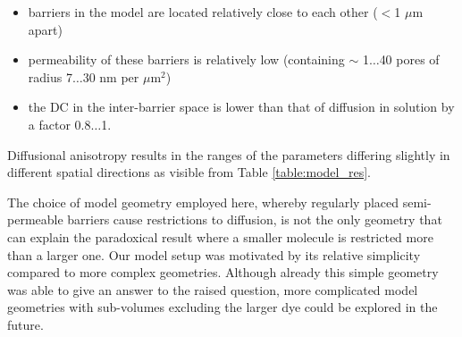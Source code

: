 \begin{itemize}
  \item barriers in the model are located relatively close to each other ($<$1 $\mu$m apart)
  \item permeability of these barriers is relatively low (containing
$\sim$ 1$\ldots$40 pores of radius 7$\ldots$30 nm per $\mu$m$^2$)
    \item the \ac{DC} in the inter-barrier space is lower than that of diffusion
in solution by a factor 0.8$\ldots$1. 
\end{itemize}
Diffusional anisotropy results in
the ranges of the parameters differing slightly in different spatial
directions as visible from Table \ref{table:model_res}.

The choice of model geometry employed here, whereby regularly placed
semi-permeable barriers cause restrictions to diffusion, is not the only
geometry that can explain the paradoxical result where a smaller
molecule is restricted more than a larger one. Our model setup was
motivated by its relative simplicity compared to more complex
geometries. Although already this simple geometry
was able to give an answer to the raised question, more complicated
model geometries with sub-volumes excluding the larger dye could be
explored in the future.

